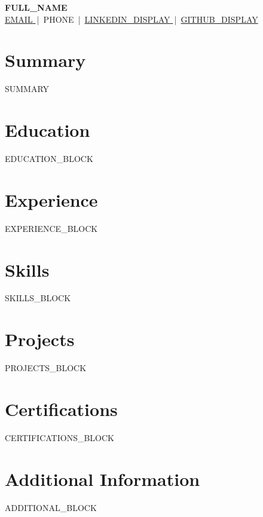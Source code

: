 \documentclass[a4paper,10pt]{article}
\begin{document}
\begin{center}
  {\LARGE\textbf{ {{FULL_NAME}} }}\\[4pt]
  {\small
    \href{mailto:{{EMAIL}}}{ {{EMAIL}} } \,|\, {{PHONE}} \,|\,
    \href{ {{LINKEDIN_URL}} }{ {{LINKEDIN_DISPLAY}} } \,|\,
    \href{ {{GITHUB_URL}} }{ {{GITHUB_DISPLAY}} }
  }
\end{center}

\section*{Summary}
{{SUMMARY}}

\section*{Education}
{{EDUCATION_BLOCK}}

\section*{Experience}
{{EXPERIENCE_BLOCK}}

\section*{Skills}
{{SKILLS_BLOCK}}

\section*{Projects}
{{PROJECTS_BLOCK}}

\section*{Certifications}
{{CERTIFICATIONS_BLOCK}}

\section*{Additional Information}
{{ADDITIONAL_BLOCK}}
\end{document}
